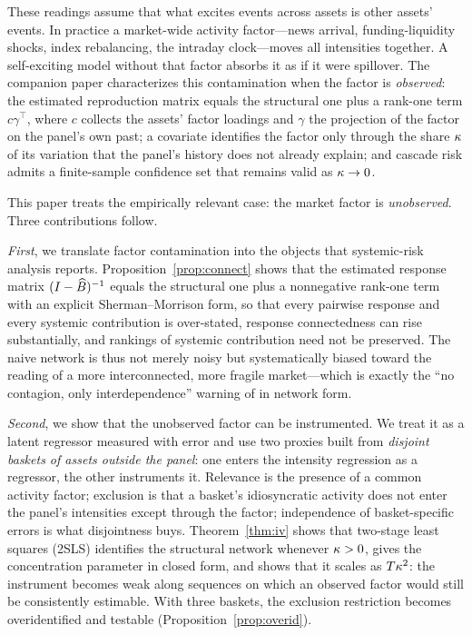 \documentclass[12pt]{article}
\theoremstyle{plain}\newtheorem{theorem}{Theorem}[section]\newtheorem{proposition}[theorem]{Proposition}\newtheorem{lemma}[theorem]{Lemma}\newtheorem{corollary}[theorem]{Corollary}
\theoremstyle{definition}\newtheorem{definition}[theorem]{Definition}\newtheorem{assumption}[theorem]{Assumption}\newtheorem{remark}[theorem]{Remark}
\begin{document}
These readings assume that what excites events across assets is other assets' events. In practice a market-wide activity factor---news arrival, funding-liquidity shocks, index rebalancing, the intraday clock---moves all intensities together. A self-exciting model without that factor absorbs it as if it were spillover. The companion paper \citep{companion2026} characterizes this contamination when the factor is \emph{observed}: the estimated reproduction matrix equals the structural one plus a rank-one term $c\gamma^{\top}$, where $c$ collects the assets' factor loadings and $\gamma$ the projection of the factor on the panel's own past; a covariate identifies the factor only through the share $\kappa$ of its variation that the panel's history does not already explain; and cascade risk admits a finite-sample confidence set that remains valid as $\kappa\to0$.

This paper treats the empirically relevant case: the market factor is \emph{unobserved}. Three contributions follow.

\emph{First}, we translate factor contamination into the objects that systemic-risk analysis reports. Proposition~\ref{prop:connect} shows that the estimated response matrix $(I-\widehat B)^{-1}$ equals the structural one plus a nonnegative rank-one term with an explicit Sherman--Morrison form, so that every pairwise response and every systemic contribution is over-stated, response connectedness can rise substantially, and rankings of systemic contribution need not be preserved. The naive network is thus not merely noisy but systematically biased toward the reading of a more interconnected, more fragile market---which is exactly the ``no contagion, only interdependence'' warning of \citet{forbes2002} in network form.

\emph{Second}, we show that the unobserved factor can be instrumented. We treat it as a latent regressor measured with error \citep{wald1940,fuller1987} and use two proxies built from \emph{disjoint baskets of assets outside the panel}: one enters the intensity regression as a regressor, the other instruments it. Relevance is the presence of a common activity factor; exclusion is that a basket's idiosyncratic activity does not enter the panel's intensities except through the factor; independence of basket-specific errors is what disjointness buys. Theorem~\ref{thm:iv} shows that two-stage least squares (2SLS) identifies the structural network whenever $\kappa>0$, gives the concentration parameter in closed form, and shows that it scales as $T\kappa^2$: the instrument becomes weak along sequences on which an observed factor would still be consistently estimable. With three baskets, the exclusion restriction becomes overidentified and testable (Proposition~\ref{prop:overid}).
\end{document}
